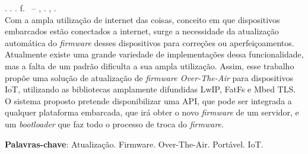 
\begin{resumo}[RESUMO]
\begin{SingleSpacing}

\imprimirautorcitacao. \imprimirtitulo. \imprimirdata. \pageref {LastPage} f. \imprimirprojeto\ – \imprimirdepartamento, \imprimirinstituicao. \imprimirlocal, \imprimirdata.\\


Com a ampla utilização  de internet das coisas, conceito em que dispositivos embarcados estão conectados a internet, surge a necessidade da atualização automática do \textit{firmware} desses dispositivos para correções ou aperfeiçoamentos. Atualmente existe uma grande variedade de implementações dessa funcionalidade, mas a falta de um padrão dificulta a sua ampla utilização.
Assim, esse trabalho propõe uma solução de atualização de \textit{firmware Over-The-Air} para dispositivos IoT, utilizando as bibliotecas amplamente difundidas LwIP, FatFs e Mbed TLS.
O sistema proposto pretende disponibilizar uma API, que pode ser integrada a qualquer plataforma embarcada, que irá obter o novo \textit{firmware} de um servidor, e um \textit{bootloader} que faz todo o processo de troca do \textit{firmware}.


\textbf{Palavras-chave}: Atualização. Firmware. Over-The-Air. Portável. IoT.




\end{SingleSpacing}
\end{resumo}


